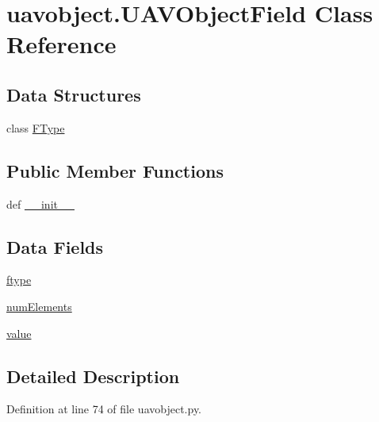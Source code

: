 \hypertarget{classuavobject_1_1_u_a_v_object_field}{\section{uavobject.\-U\-A\-V\-Object\-Field Class Reference}
\label{classuavobject_1_1_u_a_v_object_field}
}
\subsection*{Data Structures}
\begin{DoxyCompactItemize}
\item 
class \hyperlink{classuavobject_1_1_u_a_v_object_field_1_1_f_type}{F\-Type}
\end{DoxyCompactItemize}
\subsection*{Public Member Functions}
\begin{DoxyCompactItemize}
\item 
def \hyperlink{classuavobject_1_1_u_a_v_object_field_acf43e94abcf1a399fa8ca600c45e9415}{\-\_\-\-\_\-init\-\_\-\-\_\-}
\end{DoxyCompactItemize}
\subsection*{Data Fields}
\begin{DoxyCompactItemize}
\item 
\hyperlink{classuavobject_1_1_u_a_v_object_field_adbc4d62d21f682b85bd29ce9d4f32aa6}{ftype}
\item 
\hyperlink{classuavobject_1_1_u_a_v_object_field_a02814b59debbda2c3e5df04685e7fa24}{num\-Elements}
\item 
\hyperlink{classuavobject_1_1_u_a_v_object_field_a0fb06dc8a6e619248bd22427a2263e6a}{value}
\end{DoxyCompactItemize}


\subsection{Detailed Description}


Definition at line 74 of file uavobject.\-py.




